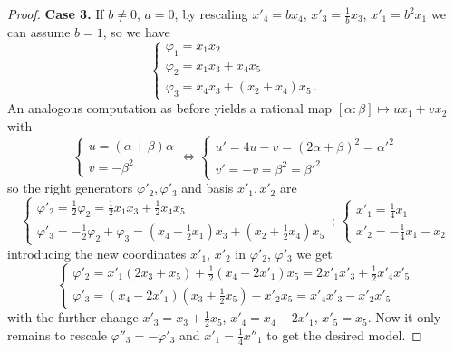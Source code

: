 \documentclass[10pt,reqno]{amsart}
\renewcommand{\a}{\alpha}
\renewcommand{\b}{\beta}
\newcommand{\f}{\varphi}
\theoremstyle{definition}
\begin{document}
\begin{proof}
\noindent \textbf{Case 3.} If $b \ne 0$, $a=0$, by rescaling $x'_4=b x_4$, $x'_3=\frac1bx_3$, $x'_1=b^2x_1$ we can assume $b=1$, so we have 
\[
\begin{cases}
    \f_1=x_1x_2 \\
    \f_2=x_1x_3+x_4x_5 \\
    \f_3=x_4x_3+(x_2+x_4)x_5 \, .
\end{cases} 
\] 
An analogous computation as before yields a rational map $[\a: \b] \mapsto u x_1 + v x_2$ with
\[
\begin{cases}
    u= (\a+\b)\a \\
    v=-\b^2
\end{cases} 
\iff 
\begin{cases}
    u'=4u-v= (2\a+\b)^2=\a'^2 \\
    v'=-v=\b^2=\b'^2
\end{cases}
\]
so the right generators $\f'_2, \f'_3$ and basis $x'_1, x'_2$ are
\[
\begin{cases}
    \f'_2= \tfrac12 \f_2=\tfrac12 x_1x_3+\tfrac12 x_4x_5 \\
    \f'_3=-\tfrac12 \f_2+\f_3=(x_4-\tfrac12 x_1)x_3+(x_2+\tfrac12 x_4)x_5
\end{cases} \, ; \,
\begin{cases}
    x'_1= \tfrac14 x_1 \\
    x'_2=-\tfrac14 x_1-x_2
\end{cases}
\]
introducing the new coordinates $x'_1$, $x'_2$ in $\f'_2$, $\f'_3$ we get
\[
\begin{cases}
    \f'_2= x'_1(2x_3+x_5)+\tfrac12 (x_4-2x'_1)x_5=2x'_1x'_3+\tfrac12 x'_4x'_5 \\
    \f'_3=(x_4-2x'_1)(x_3+\tfrac12 x_5)-x'_2x_5=x'_4x'_3-x'_2x'_5
\end{cases}
\]
with the further change $x'_3=x_3+\tfrac12 x_5$, $x'_4=x_4-2x'_1$, $x'_5=x_5$.
Now it only remains to rescale $\f''_3=-\f'_3$ and $x'_1=\frac14 x''_1$ to get the desired model.

\medskip


\end{proof}
\end{document}
